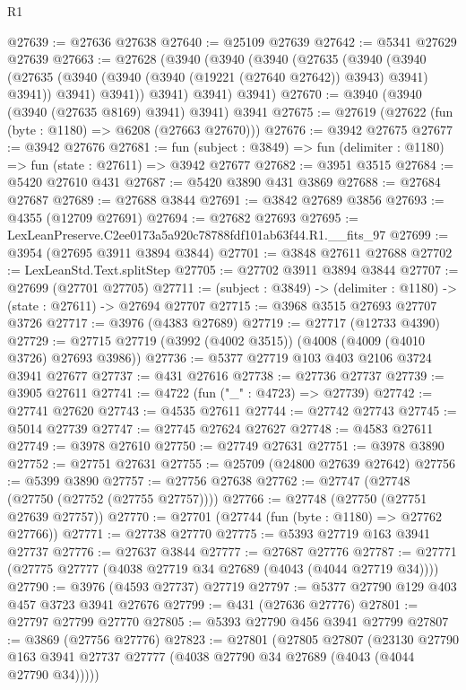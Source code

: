 \begin{lexlean}{R1}
\begin{coremodule}
@27639 := @27636 @27638
@27640 := @25109 @27639
@27642 := @5341 @27629 @27639
@27663 := @27628
    (@3940
      (@3940
        (@3940
          (@27635
            (@3940
              (@3940
                (@27635 (@3940 (@3940 (@3940 (@19221 (@27640 @27642)) @3943) @3941) @3941))
                @3941)
              @3941))
          @3941)
        @3941)
      @3941)
@27670 := @3940 (@3940 (@3940 (@27635 @8169) @3941) @3941) @3941
@27675 := @27619 (@27622 (fun (byte : @1180) => @6208 (@27663 @27670)))
@27676 := @3942 @27675
@27677 := @3942 @27676
@27681 := fun (subject : @3849) => fun (delimiter : @1180) => fun (state : @27611) => @3942 @27677
@27682 := @3951 @3515
@27684 := @5420 @27610 @431
@27687 := @5420 @3890 @431 @3869
@27688 := @27684 @27687
@27689 := @27688 @3844
@27691 := @3842 @27689 @3856
@27693 := @4355 (@12709 @27691)
@27694 := @27682 @27693
@27695 := LexLeanPreserve.C2ee0173a5a920c78788fdf101ab63f44.R1.__fits_97
@27699 := @3954 (@27695 @3911 @3894 @3844)
@27701 := @3848 @27611 @27688
@27702 := LexLeanStd.Text.splitStep
@27705 := @27702 @3911 @3894 @3844
@27707 := @27699 (@27701 @27705)
@27711 := (subject : @3849) -> (delimiter : @1180) -> (state : @27611) -> @27694 @27707
@27715 := @3968 @3515 @27693 @27707 @3726
@27717 := @3976 (@4383 @27689)
@27719 := @27717 (@12733 @4390)
@27729 := @27715 @27719 (@3992 (@4002 @3515)) (@4008 (@4009 (@4010 @3726) @27693 @3986))
@27736 := @5377 @27719 @103 @403 @2106 @3724 @3941 @27677
@27737 := @431 @27616
@27738 := @27736 @27737
@27739 := @3905 @27611
@27741 := @4722 (fun ("_" : @4723) => @27739)
@27742 := @27741 @27620
@27743 := @4535 @27611
@27744 := @27742 @27743
@27745 := @5014 @27739
@27747 := @27745 @27624 @27627
@27748 := @4583 @27611
@27749 := @3978 @27610
@27750 := @27749 @27631
@27751 := @3978 @3890
@27752 := @27751 @27631
@27755 := @25709 (@24800 @27639 @27642)
@27756 := @5399 @3890
@27757 := @27756 @27638
@27762 := @27747 (@27748 (@27750 (@27752 (@27755 @27757))))
@27766 := @27748 (@27750 (@27751 @27639 @27757))
@27770 := @27701 (@27744 (fun (byte : @1180) => @27762 @27766))
@27771 := @27738 @27770
@27775 := @5393 @27719 @163 @3941 @27737
@27776 := @27637 @3844
@27777 := @27687 @27776
@27787 := @27771 (@27775 @27777 (@4038 @27719 @34 @27689 (@4043 (@4044 @27719 @34))))
@27790 := @3976 (@4593 @27737) @27719
@27797 := @5377 @27790 @129 @403 @457 @3723 @3941 @27676
@27799 := @431 (@27636 @27776)
@27801 := @27797 @27799 @27770
@27805 := @5393 @27790 @456 @3941 @27799
@27807 := @3869 (@27756 @27776)
@27823 := @27801
    (@27805
      @27807
      (@23130 @27790 @163 @3941 @27737 @27777 (@4038 @27790 @34 @27689 (@4043 (@4044 @27790 @34)))))

\end{coremodule}
\end{lexlean}
